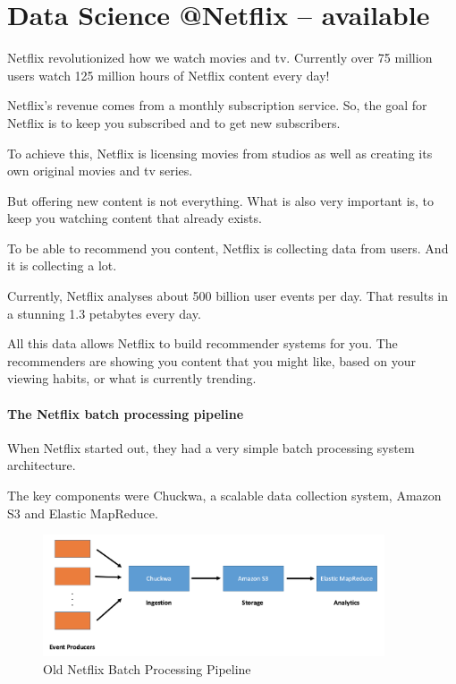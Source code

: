 \documentclass[12pt, numbers=noenddot]{scrreprt} %
\begin{document}
\section{Data Science @Netflix -- available}

Netflix revolutionized how we watch movies and tv. Currently over 75 million users watch 125 million hours of Netflix content every day!

Netflix’s revenue comes from a monthly subscription service. So, the goal for Netflix is to keep you subscribed and to get new subscribers.

To achieve this, Netflix is licensing movies from studios as well as creating its own original movies and tv series.

But offering new content is not everything. What is also very important is, to keep you watching content that already exists.

To be able to recommend you content, Netflix is collecting data from users. And it is collecting a lot.

Currently, Netflix analyses about 500 billion user events per day. That results in a stunning 1.3 petabytes every day.

All this data allows Netflix to build recommender systems for you. The recommenders are showing you content that you might like, based on your viewing habits, or what is currently trending.

\paragraph{The Netflix batch processing pipeline}
When Netflix started out, they had a very simple batch processing system architecture.

The key components were Chuckwa, a scalable data collection system, Amazon S3 and Elastic MapReduce.

\begin{figure}[htbp]
  \centering
     \includegraphics[width=0.9\textwidth]{images/Netflix-Chuckwa-Pipeline}
  \caption{Old Netflix Batch Processing Pipeline}
  \label{fig:Bild1}
\end{figure}
\end{document}
